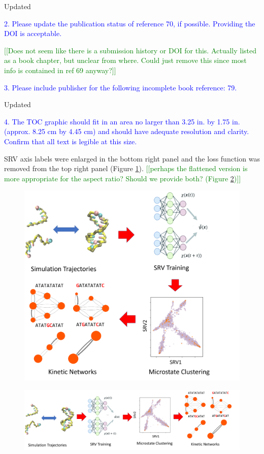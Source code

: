 \documentclass[11pt,a4paper]{letter} %
\newcommand*{\noteg}[1]{\textcolor{green}{[[#1]]}}		%
\begin{document}
Updated

\textcolor{blue}{2. Please update the publication status of reference 70, if possible.  Providing the DOI is acceptable.}

\noteg{Does not seem like there is a submission history or DOI for this. Actually listed as a book chapter, but unclear from where. Could just remove this since most info is contained in ref 69 anyway?}

\textcolor{blue}{3. Please include publisher for the following incomplete book reference: 79.}

Updated

\textcolor{blue}{4. The TOC graphic should fit in an area no larger than 3.25 in. by 1.75 in. (approx. 8.25 cm by 4.45  cm) and should have adequate resolution and clarity. Confirm that all text is legible at this size.}

SRV axis labels were enlarged in the bottom right panel and the loss function was removed from the top right panel (Figure \ref{fig:TOC_square}). \noteg{perhaps the flattened version is more appropriate for the aspect ratio? Should we provide both? (Figure \ref{fig:TOC_long})}

\begin{figure}[ht!]
	\begin{center}
        \includegraphics[width=\textwidth]{cover_letter/revision_figures/TOC_updated.png}
        \caption{}
        \label{fig:TOC_square}
	\end{center}
\end{figure}

\begin{figure}[ht!]
	\begin{center}
        \includegraphics[width=\textwidth]{cover_letter/revision_figures/TOC_updated_long.png}
        \caption{}
        \label{fig:TOC_long}
	\end{center}
\end{figure}

\clearpage
\newpage



\end{document}
